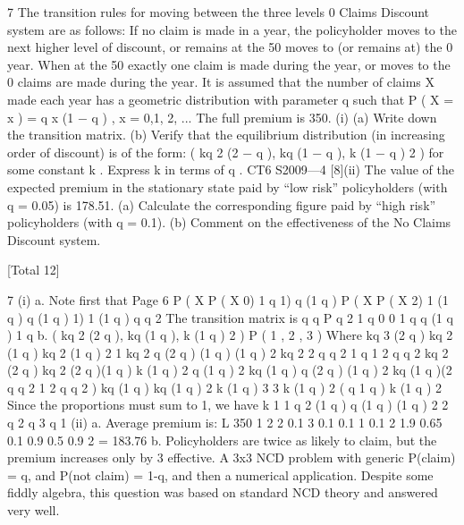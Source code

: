 \documentclass[a4paper,12pt]{article}
\begin{document}
7
The transition rules for moving between the three levels 0%
Claims Discount system are as follows:
If no claim is made in a year, the policyholder moves to the next higher level of
discount, or remains at the 50%
moves to (or remains at) the 0%
year. When at the 50%
exactly one claim is made during the year, or moves to the 0%
claims are made during the year.
It is assumed that the number of claims X made each year has a geometric distribution
with parameter q such that
P ( X = x ) = q x (1 − q ) , x = 0,1, 2, ...
The full premium is 350.
(i)
(a) Write down the transition matrix.
(b) Verify that the equilibrium distribution (in increasing order of
discount) is of the form:
( kq 2 (2 − q ), kq (1 − q ), k (1 − q ) 2 )
for some constant k . Express k in terms of q .
CT6 S2009—4
[8](ii)
The value of the expected premium in the stationary state paid by “low risk”
policyholders (with q = 0.05) is 178.51.
(a) Calculate the corresponding figure paid by “high risk” policyholders
(with q = 0.1).
(b) Comment on the effectiveness of the No Claims Discount system.

[Total 12]

7
(i)
a. Note first that
Page 6
P ( X
P ( X 0) 1 q
1) q (1 q )
P ( X
P ( X 2) 1 (1 q ) q (1 q )
1) 1 (1 q ) q
q 2%
The transition matrix is
q
q
P
q 2
1 q
0
0
1 q
q (1 q ) 1 q
b. ( kq 2 (2 q ), kq (1 q ), k (1 q ) 2 ) P ( 1 ,
2 , 3 )
Where
kq 3 (2 q ) kq 2 (1 q ) kq 2 (1 q ) 2
1
kq 2 q (2 q ) (1 q ) (1 q ) 2
kq 2 2 q q 2 1 q 1 2 q q 2
kq 2 (2 q )
kq 2 (2 q )(1 q ) k (1 q ) 2 q (1 q )
2
kq (1 q ) q (2 q ) (1 q ) 2
kq (1 q )(2 q q 2 1 2 q q 2 )
kq (1 q )
kq (1 q ) 2 k (1 q ) 3
3
k (1 q ) 2 ( q 1 q )
k (1 q ) 2
Since the proportions must sum to 1, we have
k
1 1
q 2 (1 q ) q (1 q ) (1 q ) 2 2 q 2 q 3 q 1
(ii)
a. Average premium is:
L 350
1
2
2 0.1
3
0.1
0.1 1
0.1 2 1.9 0.65 0.1 0.9 0.5 0.9 2
= 183.76
b. Policyholders are twice as likely to claim, but the premium
increases only by 3%
effective.
A 3x3 NCD problem with generic P(claim) = q, and P(not claim) = 1-q, and then a
numerical application. Despite some fiddly algebra, this question was based on
standard NCD theory and answered very well.
\end{document}
